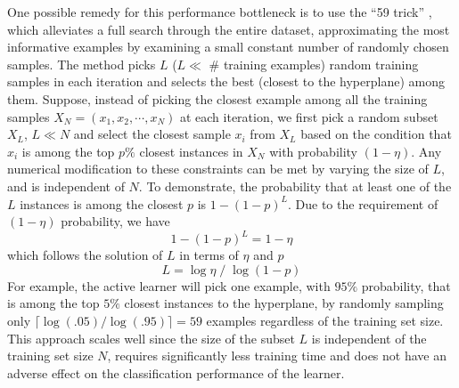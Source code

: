 One possible remedy for this performance bottleneck is to use the ``59 trick'' \cite{Smola_2000}, which alleviates a full search through the entire dataset, approximating the most informative examples by examining a small constant number of randomly chosen samples. The method picks $L$ ($L \ll$ \# training examples) random training samples in each iteration and selects the best (closest to the hyperplane) among them. Suppose, instead of picking the closest example among all the training samples $X_N=(x_1, x_2, \cdots ,x_N)$ at each iteration, we first pick a random subset $X_L$, $L\ll N$ and select the closest sample $x_i$ from $X_L$ based on the condition that $x_i$ is among the top $p\%$ closest instances in $X_N$ with probability $(1-\eta)$. Any numerical modification to these constraints can be met by varying the size of $L$, and is independent of $N$. To demonstrate, the probability that at least one of the $L$ instances is among the closest $p$ is $1-(1-p)^L$. Due to the requirement of $(1-\eta)$ probability, we have
\begin{equation}
1-(1-p)^L = 1-\eta
\end{equation}
which follows the solution of $L$ in terms of $\eta$ and $p$
\begin{equation}
L={{\log \eta} \;/\;{\log(1-p)}}
\end{equation}
For example, the active learner will pick one example, with $95\%$ probability, that is among the top $5\%$ closest instances to the hyperplane, by randomly sampling only $\lceil \log(.05)/\log(.95) \rceil = 59$ examples regardless of the training set size. This approach scales well since the size of the subset $L$ is independent of  the training set size $N$, requires significantly less training time and does not have an adverse effect on the classification performance of the learner.



